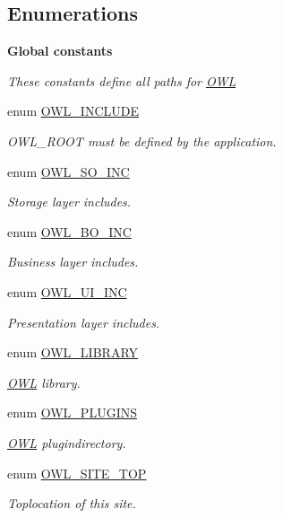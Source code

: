 \subsection*{Enumerations}
\begin{Indent}{\bf Global constants}\par
{\em \label{_amgrp08b298bc013f410cd1f593c409434f9b}
 These constants define all paths for \hyperlink{classOWL}{OWL} }\begin{DoxyCompactItemize}
\item 
enum \hyperlink{OWLloader_8php_a4d33a8f2fcc9c83cbeea921c4cb23a7f}{OWL\_\-INCLUDE} 
\begin{DoxyCompactList}\small\item\em OWL\_\-ROOT must be defined by the application. \item\end{DoxyCompactList}\item 
enum \hyperlink{OWLloader_8php_a75dffdef5ba58a0ba5f21ed40627897f}{OWL\_\-SO\_\-INC} 
\begin{DoxyCompactList}\small\item\em Storage layer includes. \item\end{DoxyCompactList}\item 
enum \hyperlink{OWLloader_8php_aca50646bc73c3addf0e0f25081eae0ae}{OWL\_\-BO\_\-INC} 
\begin{DoxyCompactList}\small\item\em Business layer includes. \item\end{DoxyCompactList}\item 
enum \hyperlink{OWLloader_8php_a2e11101c70f011a91d0d9c7f8e217738}{OWL\_\-UI\_\-INC} 
\begin{DoxyCompactList}\small\item\em Presentation layer includes. \item\end{DoxyCompactList}\item 
enum \hyperlink{OWLloader_8php_a74eed08508c8b70677c4167acf49e427}{OWL\_\-LIBRARY} 
\begin{DoxyCompactList}\small\item\em \hyperlink{classOWL}{OWL} library. \item\end{DoxyCompactList}\item 
enum \hyperlink{OWLloader_8php_acb1e6e914bd3c0c96fc20ae6bb3a8a99}{OWL\_\-PLUGINS} 
\begin{DoxyCompactList}\small\item\em \hyperlink{classOWL}{OWL} plugindirectory. \item\end{DoxyCompactList}\item 
enum \hyperlink{OWLloader_8php_a462de9ae02e394313337afac5d1a5f95}{OWL\_\-SITE\_\-TOP} 
\begin{DoxyCompactList}\small\item\em Toplocation of this site. \item\end{DoxyCompactList}\end{DoxyCompactItemize}
\end{Indent}
